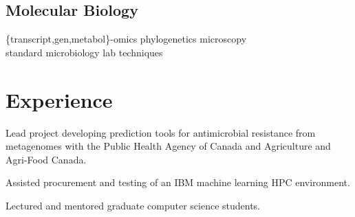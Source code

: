 \documentclass[]{Finlay_Maguire_CV}
\begin{document}
\begin{minipage}[t]{0.33\textwidth}
\subsection{Molecular Biology}
\{transcript,gen,metabol\}-omics \textbullet{} phylogenetics \textbullet{} 
microscopy \textbullet{} \\ standard microbiology lab techniques 
\sectionsep



%
%

\end{minipage} 
\hfill
\begin{minipage}[t]{0.66\textwidth} 


\section{Experience}

\sectionsep
\begin{tightemize}
\item Lead project developing prediction tools for antimicrobial resistance from metagenomes with the Public Health Agency of Canada and Agriculture and Agri-Food Canada.
\item Assisted procurement and testing of an IBM machine learning HPC environment.
\item Lectured and mentored graduate computer science students.
\end{tightemize}


\end{minipage}
\end{document}
